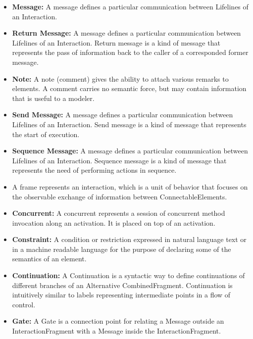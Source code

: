 \begin{itemize}
	\item \textbf{Message:} A message defines a particular communication between Lifelines of an Interaction.
	
	\item \textbf{Return Message:} A message defines a particular communication between Lifelines of an Interaction. Return message is a kind of message that represents the pass of information back to the caller of a corresponded former message.
	
	\item \textbf{Note:} A note (comment) gives the ability to attach various remarks to elements. A comment carries no semantic force, but may contain information that is useful to a modeler.
	
	\item \textbf{Send Message:} A message defines a particular communication between Lifelines of an Interaction. Send message is a kind of message that represents the start of execution.
	
	\item \textbf{Sequence Message:} A message defines a particular communication between Lifelines of an Interaction. Sequence message is a kind of message that represents the need of performing actions in sequence.
	
	\item {} A frame represents an interaction, which is a unit of behavior that focuses on the observable exchange of information between ConnectableElements.
	
	\item \textbf{Concurrent:} A concurrent represents a session of concurrent method invocation along an activation. It is placed on top of an activation.
	
	\item \textbf{Constraint:} A condition or restriction expressed in natural language text or in a machine readable language for the purpose of declaring some of the semantics of an element.
	
	\item \textbf{Continuation:} A Continuation is a syntactic way to define continuations of different branches of an Alternative CombinedFragment. Continuation is intuitively similar to labels representing intermediate points in a flow of control.
	
	\item \textbf{Gate:} A Gate is a connection point for relating a Message outside an InteractionFragment with a Message inside the InteractionFragment.
	

\end{itemize}

